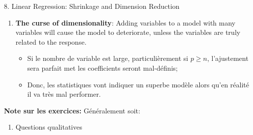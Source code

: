 \documentclass[12pt, titlepage, french]{report}
\begin{document}
\begin{CHPT_SUMM}{8. Linear Regression:  Shrinkage and Dimension Reduction}
\begin{enumerate}
\begin{enumerate}
\begin{itemize}
			\item	Les $\phi_{ji}$ sont surnommés les \textbf{loadings} et les $z_{i1}$ les \textbf{principal component scores};
			\item	Les \textit{scores} sont la distance entre les points et les \textit{principal components};
			\item	La \textbf{régression} de principal components (PCR) est \textbf{sur les principal components};
			\item	Puisqu'ils sont des moyennes pondérées de toutes les variables, PCR ne \textbf{fait pas la sélection de variable} et est semblable à la régression ridge dans ce sens;
			\item	Le plus de composantes, le plus faible le biais et le plus élevé la variance.
		\end{itemize}
		\item	\textbf{Partial Least Squares}: méthode \textit{supervisée};
		\begin{itemize}
			\item	Puisque la variable réponse est prise en compte, la direction n'est pas aussi bien ajusté;
			\item	Les prédicteurs cependant seront mieux à expliquer la réponse;
			\item	Réduit le biais en comparaison au PCA, mais augmente la variance et donc n'est pas globalement supérieur au PCA.
		\end{itemize}
	\end{enumerate}
	\item	\textbf{The curse of dimensionality}: Adding variables to a model with many variables will cause the model to deteriorate, unless the variables are truly related to the response.
	\begin{itemize}
		\item	Si le nombre de variable est large, particulièrement si $p \ge n$, l'ajustement sera parfait met les coefficients seront mal-définis;
		\item	Donc, les statistiques vont indiquer un superbe modèle alors qu'en réalité il va très mal performer.
	\end{itemize}
\end{enumerate}
\textbf{Note sur les exercices:} Généralement soit:
\begin{enumerate}
	\item	Questions qualitatives

\end{enumerate}
\end{CHPT_SUMM}
\end{document}
